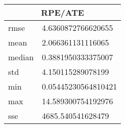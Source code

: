 \begin{table}[!ht] 
 \centering 
 \begin{tabular}{|l|l|} \hline 
 \multicolumn{2}{|c|}{RPE/ATE} \\ \hline 
 rmse & 4.6360872766620655 \\ \hline 
mean & 2.066361131116065 \\ \hline 
median & 0.3881950333375007 \\ \hline 
std & 4.150115289078199 \\ \hline 
min & 0.05445230564810421 \\ \hline 
max & 14.589300754192976 \\ \hline 
sse & 4685.540541628479 \\ \hline 
\end{tabular} 
 \end{table}